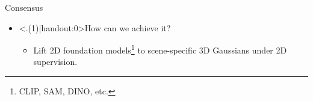 \begin{frame}
\begin{block}{Consensus}
\begin{itemize}[<+(1)->]
\begin{itemize}
			      \end{itemize}
			\item \alert<.(1)|handout:0>{How} can we achieve it?
			      \mode<presentation>{\vspace*{1.5ex}}
			      \begin{itemize}
				      \item Lift 2D foundation models\footnote{
					            CLIP, SAM, DINO, etc.
				            }
				            to scene-specific 3D Gaussians under 2D supervision.
			      \end{itemize}
		\end{itemize}
	\end{block}
\end{frame}

